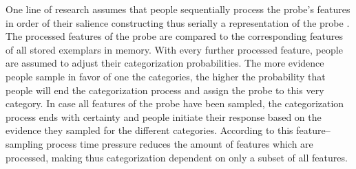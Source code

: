 \documentclass[a4paper,man,natbib]{apa6}
\begin{document}
One line of research assumes that people sequentially process the probe's features in order of their salience constructing thus serially a representation of the probe \citep{lamberts1995categorization, lamberts2000information, lamberts2002feature}. The processed features of the probe are compared to the corresponding features of all stored exemplars in memory. With every further processed feature, people are assumed to adjust their categorization probabilities. The more evidence people sample in favor of one the categories, the higher the probability that people will end the categorization process and assign the probe to this very category. In case all features of the probe have been sampled, the categorization process ends with certainty and people initiate their response based on the evidence they sampled for the different categories. According to this feature--sampling process time pressure reduces the amount of features which are processed, making thus categorization dependent on only a subset of all features. 
\end{document}
